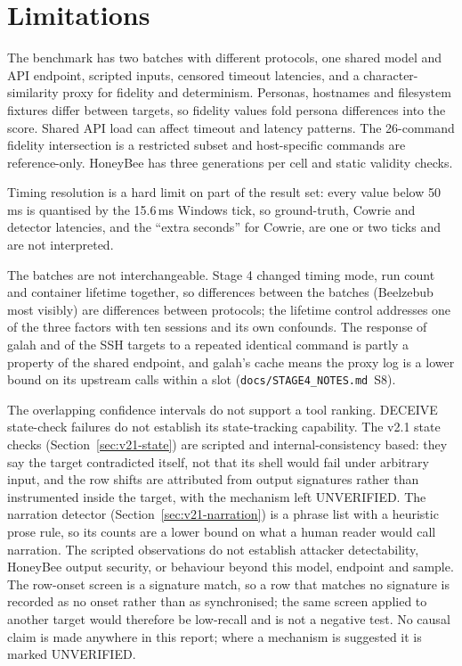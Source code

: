 \documentclass[a4paper,11pt]{article}
\begin{document}
\section{Limitations}

The benchmark has two batches with different protocols, one shared model and
API endpoint, scripted inputs, censored timeout latencies, and a
character-similarity proxy for fidelity and determinism. Personas, hostnames
and filesystem fixtures differ between targets, so fidelity values fold persona
differences into the score. Shared API load can affect timeout and latency
patterns. The 26-command fidelity intersection is a restricted subset and
host-specific commands are reference-only. HoneyBee has three generations per
cell and static validity checks.

Timing resolution is a hard limit on part of the result set: every value below
50\,ms is quantised by the 15.6\,ms Windows tick, so ground-truth, Cowrie and
detector latencies, and the ``extra seconds'' for Cowrie, are one or two ticks
and are not interpreted.

The batches are not interchangeable. Stage 4 changed timing mode, run count
and container lifetime together, so differences between the batches
(Beelzebub most visibly) are differences between protocols; the lifetime
control addresses one of the three factors with ten sessions and its own
confounds. The response of galah and of the SSH targets to a repeated identical
command is partly a property of the shared endpoint, and galah's cache means
the proxy log is a lower bound on its upstream calls within a slot
(\texttt{docs/STAGE4\_NOTES.md}~S8).

The overlapping confidence intervals do not support a tool ranking. DECEIVE
state-check failures do not establish its state-tracking capability. The v2.1
state checks (Section~\ref{sec:v21-state}) are scripted and internal-consistency
based: they say the target contradicted itself, not that its shell would fail
under arbitrary input, and the row shifts are attributed from output signatures
rather than instrumented inside the target, with the mechanism left UNVERIFIED. The narration detector
(Section~\ref{sec:v21-narration}) is a phrase list with a heuristic prose rule,
so its counts are a lower bound on what a human reader would call narration. The
scripted observations do not establish attacker detectability, HoneyBee output
security, or behaviour beyond this model, endpoint and sample. The row-onset
screen is a signature match, so a row that matches no signature is recorded as
no onset rather than as synchronised; the same screen applied to another target
would therefore be low-recall and is not a negative test. No causal claim is made anywhere in this report; where a mechanism is suggested it is marked
UNVERIFIED.
\end{document}

